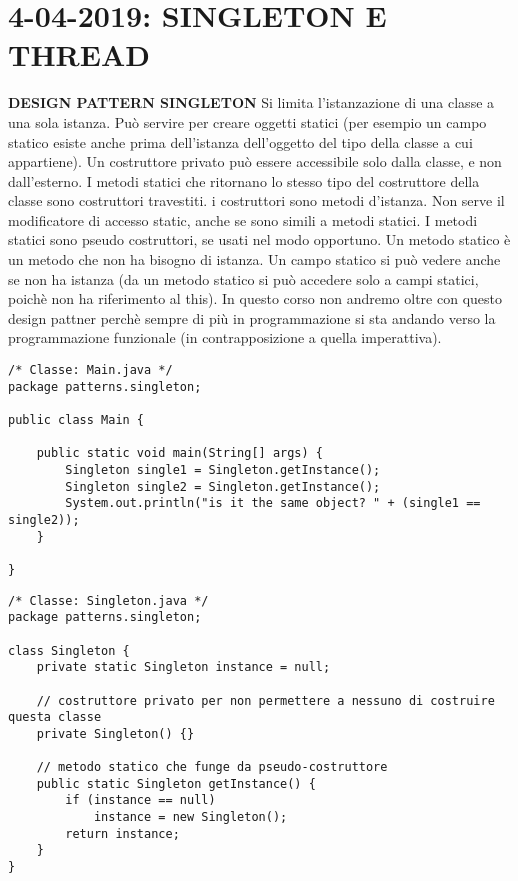 

\newpage
\section{4-04-2019: SINGLETON E THREAD}
\textbf{DESIGN PATTERN SINGLETON} \newline
Si limita l'istanzazione di una classe a una sola istanza. \newline
Può servire per creare oggetti statici (per esempio un campo statico esiste anche prima dell'istanza dell'oggetto del tipo della classe a cui appartiene). \newline
Un costruttore privato può essere accessibile solo dalla classe, e non dall'esterno. \newline
I metodi statici che ritornano lo stesso tipo del costruttore della classe sono costruttori travestiti. \newline
i costruttori sono metodi d'istanza. Non serve il modificatore di accesso static, anche se sono simili a metodi statici. \newline
I metodi statici sono pseudo costruttori, se usati nel modo opportuno. \newline
Un metodo statico è un metodo che non ha bisogno di istanza. Un campo statico si può vedere anche se non ha istanza (da un metodo statico si può accedere solo a campi statici, poichè non ha riferimento al this). \newline
In questo corso non andremo oltre con questo design pattner perchè sempre di più in programmazione si sta andando verso la programmazione funzionale (in contrapposizione a quella imperattiva).


\begin{lstlisting}
/* Classe: Main.java */
package patterns.singleton;

public class Main {

    public static void main(String[] args) {
        Singleton single1 = Singleton.getInstance();
        Singleton single2 = Singleton.getInstance();
        System.out.println("is it the same object? " + (single1 == single2));
    }

}

\end{lstlisting}

\begin{lstlisting}
/* Classe: Singleton.java */
package patterns.singleton;

class Singleton {
    private static Singleton instance = null;

    // costruttore privato per non permettere a nessuno di costruire questa classe
    private Singleton() {}

    // metodo statico che funge da pseudo-costruttore
    public static Singleton getInstance() {
        if (instance == null)
            instance = new Singleton();
        return instance;
    }
}

\end{lstlisting}



